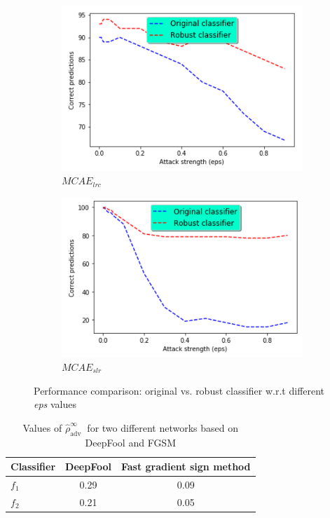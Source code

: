 \begin{figure}[h]
	\centering
	\begin{subfigure}{.48\linewidth}
		\centering
		\includegraphics[scale=1.0]{images/adversarial_training_1.png}
		\caption{$MCAE_{lrc}$}
        \label{fig:normal_vs_robust_f1}
	\end{subfigure}
	\begin{subfigure}{0.48\linewidth}
		\centering
		\includegraphics[scale=1.0]{images/adversarial_training_2.png}
		\caption{$MCAE_{slr}$}
        \label{fig:normal_vs_robust_f2}
	\end{subfigure}
	\caption{Performance comparison: original vs.  robust classifier w.r.t  different \textit{eps} values} 
	\label{fig:normal_vs_robust_models}
\end{figure}

\begin{table}[h]
    \centering
    \caption{Values of $\hat{\rho}_{\text {adv }}^{\infty}$ for two different networks based on DeepFool and FGSM}
    \begin{tabular}{l|c|c}
        \hline \textbf{Classifier} & \textbf{DeepFool} & \textbf{Fast gradient sign method} \\ \hline $f_1$ & 0.29 & 0.09 \\ \hline 
        $f_2$ & 0.21 & 0.05 \\
        \hline
    \end{tabular}
    \label{tab:robustness_result}
\end{table}

